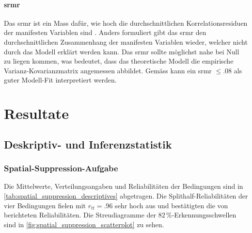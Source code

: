 \documentclass[11pt, twoside, a4paper]{book}		%
\begin{document}
\subsubsection*{\gls{srmr}}
Das \gls{srmr} ist ein Mass dafür, wie hoch die durchschnittlichen Korrelationsresiduen der manifesten Variablen sind \citep{Kline2011}. Anders formuliert gibt das \gls{srmr} den durchschnittlichen Zusammenhang der manifesten Variablen wieder, welcher nicht durch das Modell erklärt werden kann. Das \gls{srmr} sollte möglichst nahe bei Null zu liegen kommen, was bedeutet, dass das theoretische Modell die empirische Var\-ianz-Ko\-var\-ianz\-ma\-trix angemessen abbildet. Gemäss \citet{Hu1999} kann ein \gls{srmr} $\leq.08$ als guter Modell-Fit interpretiert werden.











\chapter{Resultate \label{cha:Resultate}}

\section{Deskriptiv- und Inferenzstatistik \label{sec:Deskriptive_Statistik}}

\subsection{Spatial-Suppression-Aufgabe \label{subsec:SSres}}

Die Mittelwerte, Verteilungsangaben und Reliabilitäten der Bedingungen sind in \autoref{tab:spatial_suppression_descriptives} abgetragen. 
Die Splithalf-Reliabilitäten der vier Bedingungen fielen mit $r_{tt}=.96$ sehr hoch aus und bestätigten die von \citet{Melnick2013} berichteten Reliabilitäten.
Die Streudiagramme der $82\,\%$-Er\-ken\-nungs\-schwel\-len sind in \autoref{fig:spatial_suppression_scatterplot} zu sehen.
\end{document}
